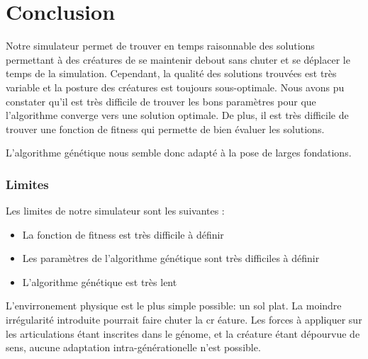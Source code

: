 \documentclass[journal, a4paper]{IEEEtran}
\begin{document}

\section{Conclusion}
	Notre simulateur permet de trouver en temps raisonnable des
	solutions permettant à des créatures de se maintenir debout sans
	chuter et	se déplacer le temps de la simulation.
	Cependant, la qualité des solutions trouvées est très variable et
	la posture des créatures est toujours sous-optimale.
	Nous avons pu constater qu'il est très difficile
	de trouver les bons paramètres pour que l'algorithme converge
	vers une solution optimale. De plus, il est très difficile
	de trouver une fonction de fitness qui permette de bien
	évaluer les solutions.

	L'algorithme génétique nous semble donc adapté à la pose de
	larges fondations.

	\subsubsection{Limites}
	Les limites de notre simulateur sont les suivantes :
	\begin{itemize}
		\item La fonction de fitness est très difficile à définir
		\item Les paramètres de l'algorithme génétique sont très difficiles
		à définir
		\item L'algorithme génétique est très lent
	\end{itemize}
	L'envirronement physique est le plus simple possible: un sol plat.
	La moindre irrégularité introduite pourrait faire chuter la cr
	éature.
	Les forces à appliquer sur les articulations étant inscrites dans
	le génome, et la créature étant dépourvue de sens, aucune adaptation
	intra-générationelle n'est possible.
\end{document}
